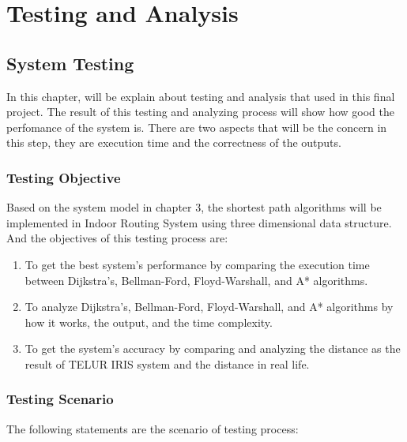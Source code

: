 \chapter{Testing and Analysis}
\section{System Testing}
In this chapter, will be explain about testing and analysis that used in this final project. The result of this testing and analyzing process will show how good the perfomance of the system is. There are two aspects that will be the concern in this step, they are execution time and the correctness of the outputs.  

\subsection{Testing Objective}
Based on the system model in chapter 3, the shortest path algorithms will be implemented in Indoor Routing System using three dimensional data structure. And the objectives of this testing process are:
\begin{enumerate}
	\item To get the best system's performance by comparing the execution time between Dijkstra's, Bellman-Ford, Floyd-Warshall, and A* algorithms.
	\item To analyze Dijkstra's, Bellman-Ford, Floyd-Warshall, and A* algorithms by how it works, the output, and the time complexity.
	\item To get the system's accuracy by comparing and analyzing the distance as the result of TELUR IRIS system and  the distance in real life.
\end{enumerate}

\subsection{Testing Scenario}
The following statements are the scenario of testing process:

